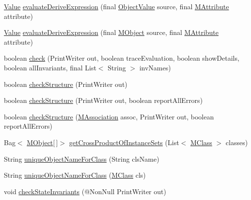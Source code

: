 \begin{DoxyCompactItemize}
\item 
\hyperlink{classorg_1_1tzi_1_1use_1_1uml_1_1ocl_1_1value_1_1_value}{Value} \hyperlink{classorg_1_1tzi_1_1use_1_1uml_1_1sys_1_1_m_system_state_ab7686b474cb28df5855ac31b21e9f4d2}{evaluate\-Derive\-Expression} (final \hyperlink{classorg_1_1tzi_1_1use_1_1uml_1_1ocl_1_1value_1_1_object_value}{Object\-Value} source, final \hyperlink{classorg_1_1tzi_1_1use_1_1uml_1_1mm_1_1_m_attribute}{M\-Attribute} attribute)
\item 
\hyperlink{classorg_1_1tzi_1_1use_1_1uml_1_1ocl_1_1value_1_1_value}{Value} \hyperlink{classorg_1_1tzi_1_1use_1_1uml_1_1sys_1_1_m_system_state_a84728aa123b259feedbb437de92fb0a6}{evaluate\-Derive\-Expression} (final \hyperlink{interfaceorg_1_1tzi_1_1use_1_1uml_1_1sys_1_1_m_object}{M\-Object} source, final \hyperlink{classorg_1_1tzi_1_1use_1_1uml_1_1mm_1_1_m_attribute}{M\-Attribute} attribute)
\item 
boolean \hyperlink{classorg_1_1tzi_1_1use_1_1uml_1_1sys_1_1_m_system_state_a3b79e58e515bbb636cf2a0c5726f72c3}{check} (Print\-Writer out, boolean trace\-Evaluation, boolean show\-Details, boolean all\-Invariants, final List$<$ String $>$ inv\-Names)
\item 
boolean \hyperlink{classorg_1_1tzi_1_1use_1_1uml_1_1sys_1_1_m_system_state_a5f05d1b1948531d701c80c9e249cac6f}{check\-Structure} (Print\-Writer out)
\item 
boolean \hyperlink{classorg_1_1tzi_1_1use_1_1uml_1_1sys_1_1_m_system_state_a698e856fb4b901cd1db3eb1715cd9cd5}{check\-Structure} (Print\-Writer out, boolean report\-All\-Errors)
\item 
boolean \hyperlink{classorg_1_1tzi_1_1use_1_1uml_1_1sys_1_1_m_system_state_ac008b645a5cc6919e62b7d1055856a0f}{check\-Structure} (\hyperlink{interfaceorg_1_1tzi_1_1use_1_1uml_1_1mm_1_1_m_association}{M\-Association} assoc, Print\-Writer out, boolean report\-All\-Errors)
\item 
Bag$<$ \hyperlink{interfaceorg_1_1tzi_1_1use_1_1uml_1_1sys_1_1_m_object}{M\-Object}\mbox{[}$\,$\mbox{]}$>$ \hyperlink{classorg_1_1tzi_1_1use_1_1uml_1_1sys_1_1_m_system_state_a5100ce95a2e44fa936ae662022006357}{get\-Cross\-Product\-Of\-Instance\-Sets} (List$<$ \hyperlink{interfaceorg_1_1tzi_1_1use_1_1uml_1_1mm_1_1_m_class}{M\-Class} $>$ classes)
\item 
String \hyperlink{classorg_1_1tzi_1_1use_1_1uml_1_1sys_1_1_m_system_state_a968c0cdaa71702f5c68385621570cd6a}{unique\-Object\-Name\-For\-Class} (String cls\-Name)
\item 
String \hyperlink{classorg_1_1tzi_1_1use_1_1uml_1_1sys_1_1_m_system_state_a4cac802b947fa14fc1af55c04d741e9a}{unique\-Object\-Name\-For\-Class} (\hyperlink{interfaceorg_1_1tzi_1_1use_1_1uml_1_1mm_1_1_m_class}{M\-Class} cls)
\item 
void \hyperlink{classorg_1_1tzi_1_1use_1_1uml_1_1sys_1_1_m_system_state_a47eae883beb7fafd21ed1f708d18beb1}{check\-State\-Invariants} (@Non\-Null Print\-Writer out)
\end{DoxyCompactItemize}

